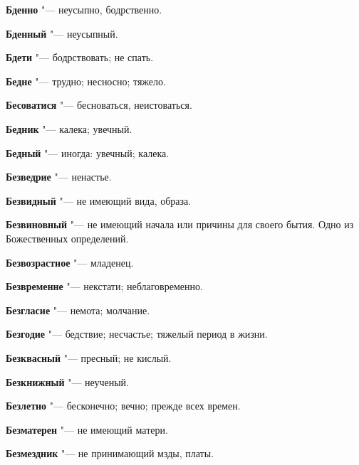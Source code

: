 \begin{mymulticols}{2}
\noindent\textbf{Бденно} "--- неусыпно, бодрственно. 




\noindent\textbf{Бденный} "--- неусыпный. 




\noindent\textbf{Бдети} "--- бодрствовать; не спать. 




\noindent\textbf{Бедне} "--- трудно; несносно; тяжело. 




\noindent\textbf{Бесоватися} "--- бесноваться, неистоваться. 




\noindent\textbf{Бедник} "--- калека; увечный. 




\noindent\textbf{Бедный} "--- иногда: увечный; калека. 




\noindent\textbf{Безведрие} "--- ненастье. 




\noindent\textbf{Безвидный} "--- не имеющий вида, образа. 




\noindent\textbf{Безвиновный} "--- не имеющий начала или причины для своего бытия. Одно из Божественных определений. 




\noindent\textbf{Безвозрастное} "--- младенец. 




\noindent\textbf{Безвременне} "--- некстати; неблаговременно. 




\noindent\textbf{Безгласие} "--- немота; молчание. 




\noindent\textbf{Безгодие} "--- бедствие; несчастье; тяжелый период в жизни. 




\noindent\textbf{Безквасный} "--- пресный; не кислый. 




\noindent\textbf{Безкнижный} "--- неученый. 




\noindent\textbf{Безлетно} "--- бесконечно; вечно; прежде всех времен. 




\noindent\textbf{Безматерен} "--- не имеющий матери. 




\noindent\textbf{Безмездник} "--- не принимающий мзды, платы. 





\end{mymulticols}
